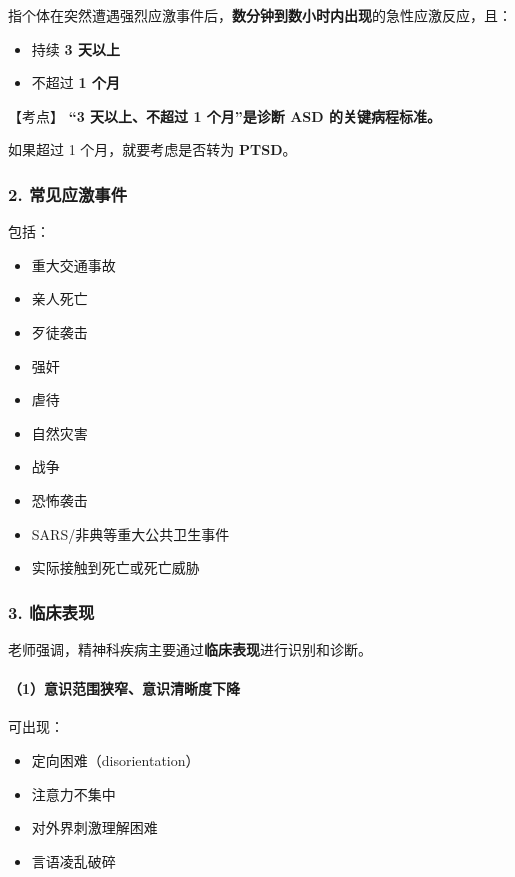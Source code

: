 \documentclass[
  chinese,
  9pt,
  a4paper,
]{ctexart}
\providecommand{\tightlist}{%
  \setlength{\itemsep}{0pt}\setlength{\parskip}{0pt}}
\begin{document}
指个体在突然遭遇强烈应激事件后，\textbf{数分钟到数小时内出现}的急性应激反应，且：

\begin{itemize}
\tightlist
\item
  持续 \textbf{3 天以上}
\item
  不超过 \textbf{1 个月}
\end{itemize}

【考点】 \textbf{``3 天以上、不超过 1 个月''是诊断 ASD 的关键病程标准。}

如果超过 1 个月，就要考虑是否转为 \textbf{PTSD}。

\subsubsection{2.
常见应激事件}\label{ux5e38ux89c1ux5e94ux6fc0ux4e8bux4ef6}

包括：

\begin{itemize}
\tightlist
\item
  重大交通事故
\item
  亲人死亡
\item
  歹徒袭击
\item
  强奸
\item
  虐待
\item
  自然灾害
\item
  战争
\item
  恐怖袭击
\item
  SARS/非典等重大公共卫生事件
\item
  实际接触到死亡或死亡威胁
\end{itemize}

\subsubsection{3. 临床表现}\label{ux4e34ux5e8aux8868ux73b0}

老师强调，精神科疾病主要通过\textbf{临床表现}进行识别和诊断。

\paragraph{（1）意识范围狭窄、意识清晰度下降}\label{ux610fux8bc6ux8303ux56f4ux72edux7a84ux610fux8bc6ux6e05ux6670ux5ea6ux4e0bux964d}

可出现：

\begin{itemize}
\tightlist
\item
  定向困难（disorientation）
\item
  注意力不集中
\item
  对外界刺激理解困难
\item
  言语凌乱破碎
\end{itemize}
\end{document}
